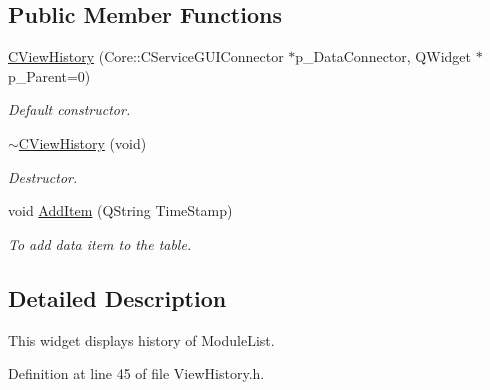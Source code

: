 \subsection*{\-Public \-Member \-Functions}
\begin{DoxyCompactItemize}
\item 
\hyperlink{classSystemTracking_1_1CViewHistory_a2875f8ce3c650cd94cdb37ff746d362d}{\-C\-View\-History} (\-Core\-::\-C\-Service\-G\-U\-I\-Connector $\ast$p\-\_\-\-Data\-Connector, \-Q\-Widget $\ast$p\-\_\-\-Parent=0)
\begin{DoxyCompactList}\small\item\em \-Default constructor. \end{DoxyCompactList}\item 
\hyperlink{classSystemTracking_1_1CViewHistory_a24823083dd3d42a87762bd9fff088f9a}{$\sim$\-C\-View\-History} (void)
\begin{DoxyCompactList}\small\item\em \-Destructor. \end{DoxyCompactList}\item 
void \hyperlink{classSystemTracking_1_1CViewHistory_a24d22b4beb1003bed2922339d3cd231c}{\-Add\-Item} (\-Q\-String \-Time\-Stamp)
\begin{DoxyCompactList}\small\item\em \-To add data item to the table. \end{DoxyCompactList}\end{DoxyCompactItemize}


\subsection{\-Detailed \-Description}
\-This widget displays history of \-Module\-List. 

\-Definition at line 45 of file \-View\-History.\-h.



